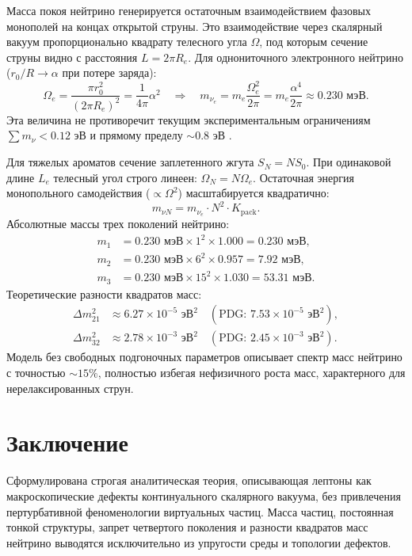 \documentclass[12pt,a4paper]{article}
\begin{document}
	Масса покоя нейтрино генерируется остаточным взаимодействием фазовых монополей на концах открытой струны. Это взаимодействие через скалярный вакуум пропорционально квадрату телесного угла $\Omega$, под которым сечение струны видно с расстояния $L = 2\pi R_e$.
	Для однониточного электронного нейтрино ($r_0/R \to \alpha$ при потере заряда):
	\begin{equation}
		\Omega_e = \frac{\pi r_0^2}{(2\pi R_e)^2} = \frac{1}{4\pi} \alpha^2 \quad \Longrightarrow \quad m_{\nu_e} = m_e \frac{\Omega_e^2}{2\pi} = m_e \frac{\alpha^4}{2\pi} \approx 0.230 \text{ мэВ}.
		\label{eq:neutrino_mass_exact}
	\end{equation}
	Эта величина не противоречит текущим экспериментальным ограничениям $\sum m_\nu < 0.12$ эВ \cite{pdg2024} и прямому пределу $\sim 0.8$ эВ \cite{katrin2022}.
	
	Для тяжелых ароматов сечение заплетенного жгута $S_N = N S_0$. При одинаковой длине $L_e$ телесный угол строго линеен: $\Omega_N = N \Omega_e$. Остаточная энергия монопольного самодействия ($\propto \Omega^2$) масштабируется квадратично:
	\begin{equation}
		m_{\nu N} = m_{\nu_e} \cdot N^2 \cdot K_{\text{pack}}.
	\end{equation}
	Абсолютные массы трех поколений нейтрино:
	\begin{align}
		m_1 &= 0.230 \text{ мэВ} \times 1^2 \times 1.000 = 0.230 \text{ мэВ}, \\
		m_2 &= 0.230 \text{ мэВ} \times 6^2 \times 0.957 = 7.92 \text{ мэВ}, \\
		m_3 &= 0.230 \text{ мэВ} \times 15^2 \times 1.030 = 53.31 \text{ мэВ}.
	\end{align}
	Теоретические разности квадратов масс:
	\begin{align}
		\Delta m^2_{21} &\approx 6.27 \times 10^{-5} \text{ эВ}^2 \quad (\text{PDG: } 7.53 \times 10^{-5} \text{ эВ}^2), \\
		\Delta m^2_{32} &\approx 2.78 \times 10^{-3} \text{ эВ}^2 \quad (\text{PDG: } 2.45 \times 10^{-3} \text{ эВ}^2).
	\end{align}
	Модель без свободных подгоночных параметров описывает спектр масс нейтрино с точностью $\sim 15\%$, полностью избегая нефизичного роста масс, характерного для нерелаксированных струн.
	
	\section{Заключение}
	Сформулирована строгая аналитическая теория, описывающая лептоны как макроскопические дефекты континуального скалярного вакуума, без привлечения пертурбативной феноменологии виртуальных частиц. Масса частиц, постоянная тонкой структуры, запрет четвертого поколения и разности квадратов масс нейтрино выводятся исключительно из упругости среды и топологии дефектов.
	
\end{document}

